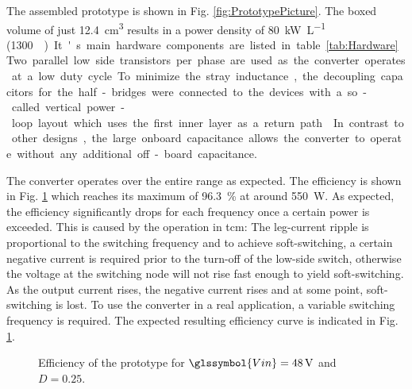 \documentclass{IPEC2026}
\newcommand{\sbl}[1]{\glssymbol{#1}}
\newcommand{\ac}{\gls}
\begin{document}
The assembled prototype is shown in Fig. \ref{fig:PrototypePicture}. The boxed volume of just \qty{12.4}{\cubic\cm} results in a power density of \qty{80}{\kW\per\liter} (\qty{1300}{\W\per\cubic\inch}). It's main hardware components are listed in table \ref{tab:Hardware}. Two parallel low side transistors per phase are used as the converter operates at a low duty cycle. To minimize the stray inductance, the decoupling capacitors for the half-bridges were connected to the devices with a so-called vertical power-loop layout which uses the first inner layer as a return path \cite{reuschUnderstandingEffectPCB2014}. In contrast to other designs, the large onboard capacitance allows the converter to operate without any additional off-board capacitance. \par
The converter operates over the entire range as expected. The efficiency is shown in Fig. \ref{fig:Efficiency} which reaches its maximum of \qty{96.3}{\percent} at around \qty{550}{\W}. As expected, the efficiency significantly drops for each frequency once a certain power is exceeded. This is caused by the operation in \ac{tcm}: The leg-current ripple is proportional to the switching frequency and to achieve soft-switching, a certain negative current is required prior to the turn-off of the low-side switch, otherwise the voltage at the switching node will not rise fast enough to yield soft-switching. As the output current rises, the negative current rises and at some point, soft-switching is lost. %
To use the converter in a real application, a variable switching frequency is required. The expected resulting efficiency curve is indicated in Fig. \ref{fig:Efficiency}.

\begin{figure}
  \centering
  
  \caption{Efficiency of the prototype for $\sbl{Vin}=\qty{48}{\V}$ and $D=0.25$.}
  \label{fig:Efficiency}
\end{figure}
\end{document}
